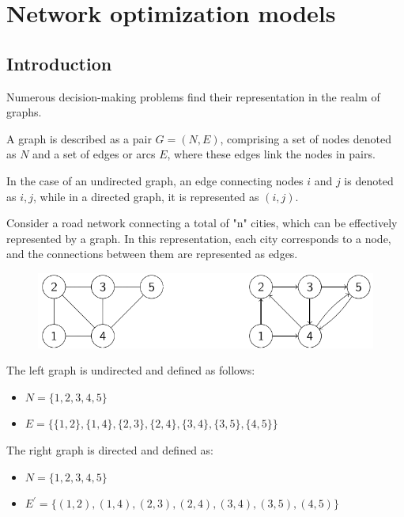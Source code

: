 \documentclass[12pt, a4paper]{report}
\begin{document}
\newpage

\chapter{Network optimization models}
    \section{Introduction}
    Numerous decision-making problems find their representation in the realm of graphs.
    \begin{definition}
        A graph is described as a pair $G=(N,E)$, comprising a set of nodes denoted as $N$ and a set of edges or arcs $E$, where these edges link the nodes in pairs.

    In the case of an undirected graph, an edge connecting nodes $i$ and $j$ is denoted as ${i,j}$, while in a directed graph, it is represented as $(i,j)$.    \end{definition}
    \begin{example}
        Consider a road network connecting a total of "n" cities, which can be effectively represented by a graph. 
        In this representation, each city corresponds to a node, and the connections between them are represented as edges.        
        \begin{figure}[H]
            \centering
            \includegraphics[width=0.75\linewidth]{images/graph.png}
        \end{figure}
        The left graph is undirected and defined as follows:
        \begin{itemize}
            \item $N=\{1,2,3,4,5\}$
            \item $E=\{\{1,2\},\{1,4\},\{2,3\},\{2,4\},\{3,4\},\{3,5\},\{4,5\}\}$
        \end{itemize}
        The right graph is directed and defined as:
        \begin{itemize}
            \item $N=\{1,2,3,4,5\}$
            \item $E^{'}=\{(1,2),(1,4),(2,3),(2,4),(3,4),(3,5),(4,5)\}$
        \end{itemize}
    \end{example}
\end{document}
